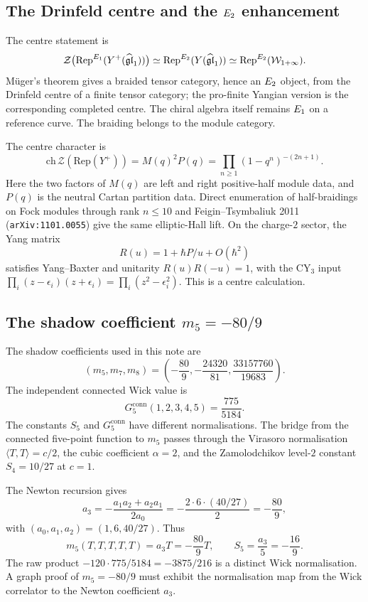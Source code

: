 \subsection*{The Drinfeld centre and the $E_2$ enhancement}

The centre statement is
\[
\mathcal Z\bigl(\mathrm{Rep}^{E_1}(Y^+(\widehat{\mathfrak{gl}}_1))\bigr)
\simeq
\mathrm{Rep}^{E_2}(Y(\widehat{\mathfrak{gl}}_1))
\simeq
\mathrm{Rep}^{E_2}(\mathcal{W}_{1+\infty}).
\]
Müger's theorem gives a braided tensor category, hence an $E_2$
object, from the Drinfeld centre of a finite tensor category; the
pro-finite Yangian version is the corresponding completed centre. The
chiral algebra itself remains $E_1$ on a reference curve. The
braiding belongs to the module category.

The centre character is
\[
\mathrm{ch}\,\mathcal Z(\mathrm{Rep}(Y^+))
  =M(q)^2P(q)
  =\prod_{n\ge1}(1-q^n)^{-(2n+1)}.
\]
Here the two factors of $M(q)$ are left and right positive-half module
data, and $P(q)$ is the neutral Cartan partition data. Direct
enumeration of half-braidings on Fock modules through rank $n\le10$
and Feigin--Tsymbaliuk 2011 (\texttt{arXiv:1101.0055}) give the same
elliptic-Hall lift. On the charge-$2$ sector, the Yang matrix
\[
R(u)=1+\hbar P/u+O(\hbar^2)
\]
satisfies Yang--Baxter and unitarity
$R(u)R(-u)=1$, with the CY$_3$ input
$\prod_i(z-\epsilon_i)(z+\epsilon_i)=\prod_i(z^2-\epsilon_i^2)$.
This is a centre calculation.

\subsection*{The shadow coefficient $m_5=-80/9$}

The shadow coefficients used in this note are
\[
(m_5,m_7,m_8)=\left(-\frac{80}{9},-\frac{24320}{81},
\frac{33157760}{19683}\right).
\]
The independent connected Wick value is
\[
G_5^{\mathrm{conn}}(1,2,3,4,5)=\frac{775}{5184}.
\]
The constants $S_5$ and $G_5^{\mathrm{conn}}$ have different
normalisations. The bridge from the connected five-point
function to $m_5$ passes through the Virasoro normalisation
$\langle T,T\rangle=c/2$, the cubic coefficient $\alpha=2$, and the
Zamolodchikov level-$2$ constant $S_4=10/27$ at $c=1$.

The Newton recursion gives
\[
a_3
=-\frac{a_1a_2+a_2a_1}{2a_0}
=-\frac{2\cdot6\cdot(40/27)}{2}
=-\frac{80}{9},
\]
with $(a_0,a_1,a_2)=(1,6,40/27)$. Thus
\[
m_5(T,T,T,T,T)=a_3T=-\frac{80}{9}T,
\qquad
S_5=\frac{a_3}{5}=-\frac{16}{9}.
\]
The raw product $-120\cdot775/5184=-3875/216$ is a distinct Wick
normalisation. A graph proof of $m_5=-80/9$ must exhibit the
normalisation map from the Wick correlator to the Newton coefficient
$a_3$.

